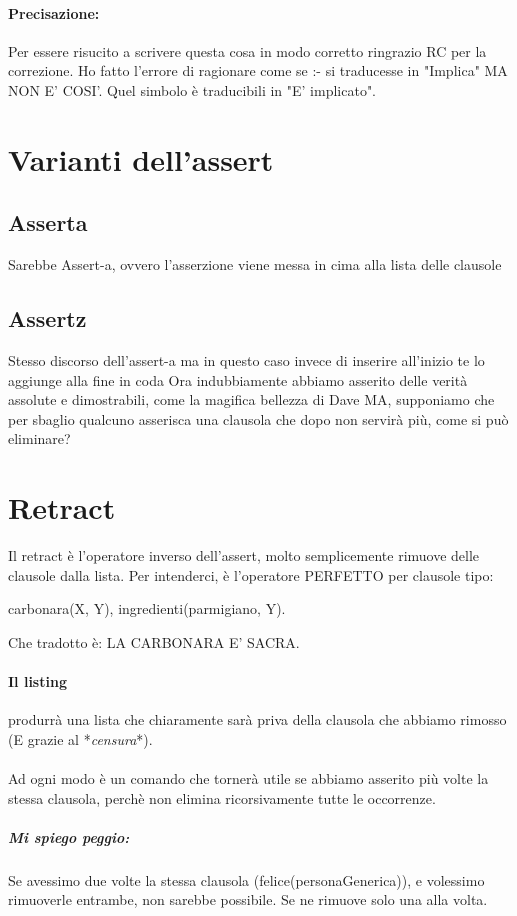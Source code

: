 \documentclass[12pt, a4paper, openany, oneside]{book}
\begin{document}
\paragraph{Precisazione: }Per essere risucito a scrivere questa cosa in modo 
corretto ringrazio RC per la correzione. Ho fatto l'errore di ragionare come 
se :- si traducesse in "Implica" MA NON E' COSI'. Quel simbolo è traducibili in 
"E' implicato".
\section{Varianti dell'assert}
\subsection{Asserta}
Sarebbe Assert-a, ovvero l'asserzione viene messa in cima alla lista delle 
clausole
\subsection{Assertz}
Stesso discorso dell'assert-a ma in questo caso invece di inserire all'inizio
te lo aggiunge alla fine in coda
Ora indubbiamente abbiamo asserito delle verità assolute e dimostrabili, come
la magifica bellezza di Dave MA, supponiamo che per sbaglio qualcuno asserisca
una clausola che dopo non servirà più, come si può eliminare? 
\section{Retract}
Il retract è l'operatore inverso dell'assert, molto semplicemente rimuove delle
clausole dalla lista. Per intenderci, è l'operatore PERFETTO per clausole tipo:
\begin{center}
carbonara(X, Y), ingredienti(parmigiano, Y). 
\end{center}
Che tradotto è: LA CARBONARA E' SACRA.
\paragraph{Il listing} produrrà una lista che chiaramente sarà priva della 
clausola che abbiamo rimosso (E grazie al *\textit{censura}*). \\ \\
Ad ogni modo è un comando che tornerà utile se abbiamo asserito più volte
la stessa clausola, perchè non elimina ricorsivamente tutte le occorrenze.
\subparagraph{Mi spiego peggio: }Se avessimo due volte la stessa clausola 
(felice(personaGenerica)), e volessimo rimuoverle entrambe, non sarebbe possibile.
Se ne rimuove solo una alla volta.
%
\end{document}
